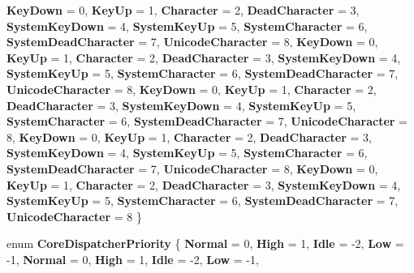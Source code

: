 \begin{DoxyCompactItemize}
{\bfseries Key\+Down} = 0, 
{\bfseries Key\+Up} = 1, 
{\bfseries Character} = 2, 
{\bfseries Dead\+Character} = 3, 
\newline
{\bfseries System\+Key\+Down} = 4, 
{\bfseries System\+Key\+Up} = 5, 
{\bfseries System\+Character} = 6, 
{\bfseries System\+Dead\+Character} = 7, 
\newline
{\bfseries Unicode\+Character} = 8, 
{\bfseries Key\+Down} = 0, 
{\bfseries Key\+Up} = 1, 
{\bfseries Character} = 2, 
\newline
{\bfseries Dead\+Character} = 3, 
{\bfseries System\+Key\+Down} = 4, 
{\bfseries System\+Key\+Up} = 5, 
{\bfseries System\+Character} = 6, 
\newline
{\bfseries System\+Dead\+Character} = 7, 
{\bfseries Unicode\+Character} = 8, 
{\bfseries Key\+Down} = 0, 
{\bfseries Key\+Up} = 1, 
\newline
{\bfseries Character} = 2, 
{\bfseries Dead\+Character} = 3, 
{\bfseries System\+Key\+Down} = 4, 
{\bfseries System\+Key\+Up} = 5, 
\newline
{\bfseries System\+Character} = 6, 
{\bfseries System\+Dead\+Character} = 7, 
{\bfseries Unicode\+Character} = 8, 
{\bfseries Key\+Down} = 0, 
\newline
{\bfseries Key\+Up} = 1, 
{\bfseries Character} = 2, 
{\bfseries Dead\+Character} = 3, 
{\bfseries System\+Key\+Down} = 4, 
\newline
{\bfseries System\+Key\+Up} = 5, 
{\bfseries System\+Character} = 6, 
{\bfseries System\+Dead\+Character} = 7, 
{\bfseries Unicode\+Character} = 8, 
\newline
{\bfseries Key\+Down} = 0, 
{\bfseries Key\+Up} = 1, 
{\bfseries Character} = 2, 
{\bfseries Dead\+Character} = 3, 
\newline
{\bfseries System\+Key\+Down} = 4, 
{\bfseries System\+Key\+Up} = 5, 
{\bfseries System\+Character} = 6, 
{\bfseries System\+Dead\+Character} = 7, 
\newline
{\bfseries Unicode\+Character} = 8
 \}
\item 
\mbox{\label{namespace_windows_1_1_u_i_1_1_core_a612646cf897e13d073df58cbf255fea7}} 
enum {\bfseries Core\+Dispatcher\+Priority} \{ \newline
{\bfseries Normal} = 0, 
{\bfseries High} = 1, 
{\bfseries Idle} = -\/2, 
{\bfseries Low} = -\/1, 
\newline
{\bfseries Normal} = 0, 
{\bfseries High} = 1, 
{\bfseries Idle} = -\/2, 
{\bfseries Low} = -\/1, 

\end{DoxyCompactItemize}
